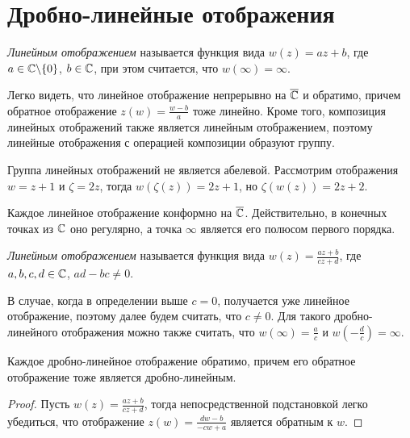 \section{Дробно-линейные отображения}

\begin{definition}
	\textit{Линейным отображением} называется функция вида $w(z) = az + b$, где $a \in \mathbb{C} \backslash \{0\}$, $b \in \mathbb{C}$, при этом считается, что $w(\infty) = \infty$.
\end{definition}

\begin{note}
	Легко видеть, что линейное отображение непрерывно на $\overline{\mathbb{C}}$ и обратимо, причем обратное отображение $z(w) = \frac{w - b}{a}$ тоже линейно. Кроме того, композиция линейных отображений также является линейным отображением, поэтому линейные отображения с операцией композиции образуют группу.
\end{note}

\begin{example}
	Группа линейных отображений не является абелевой. Рассмотрим отображения $w = z + 1$ и $\zeta = 2z$, тогда $w(\zeta(z)) = 2z + 1$, но $\zeta(w(z)) = 2z + 2$.
\end{example}

\begin{note}
	Каждое линейное отображение конформно на $\overline{\mathbb{C}}$. Действительно, в конечных точках из $\mathbb{C}$ оно регулярно, а точка $\infty$ является его полюсом первого порядка.
\end{note}

\begin{definition}
	\textit{Линейным отображением} называется функция вида $w(z) = \frac{az + b}{cz + d}$, где $a, b, c, d \in \mathbb{C}$, $ad - bc \ne 0$.
\end{definition}

\begin{note}
	В случае, когда в определении выше $c = 0$, получается уже линейное отображение, поэтому далее будем считать, что $c \ne 0$. Для такого дробно-линейного отображения можно также считать, что $w(\infty) = \frac ac$ и $w(-\frac dc) = \infty$.
\end{note}

\begin{proposition}
	Каждое дробно-линейное отображение обратимо, причем его обратное отображение тоже является дробно-линейным.
\end{proposition}

\begin{proof}
	Пусть $w(z) = \frac{az + b}{cz + d}$, тогда непосредственной подстановкой легко убедиться, что отображение $z(w) = \frac{dw - b}{-cw + a}$ является обратным к $w$.
\end{proof}

